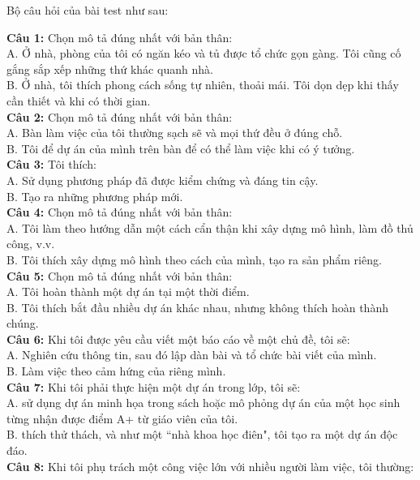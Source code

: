 Bộ câu hỏi của bài test như sau:
\begin{multicols}{2}
\noindent
\textbf{Câu 1:} Chọn mô tả đúng nhất với bản thân: \\
A. Ở nhà, phòng của tôi có ngăn kéo và tủ được tổ chức gọn gàng. Tôi cũng cố gắng sắp xếp những thứ khác quanh nhà. \\
B. Ở nhà, tôi thích phong cách sống tự nhiên, thoải mái. Tôi dọn dẹp khi thấy cần thiết và khi có thời gian. \\
\textbf{Câu 2:} Chọn mô tả đúng nhất với bản thân: \\
A. Bàn làm việc của tôi thường sạch sẽ và mọi thứ đều ở đúng chỗ. \\
B. Tôi để dự án của mình trên bàn để có thể làm việc khi có ý tưởng. \\
\textbf{Câu 3:} Tôi thích: \\
A. Sử dụng phương pháp đã được kiểm chứng và đáng tin cậy. \\
B. Tạo ra những phương pháp mới. \\
\textbf{Câu 4:} Chọn mô tả đúng nhất với bản thân: \\
A. Tôi làm theo hướng dẫn một cách cẩn thận khi xây dựng mô hình, làm đồ thủ công, v.v. \\
B. Tôi thích xây dựng mô hình theo cách của mình, tạo ra sản phẩm riêng. \\
\textbf{Câu 5:} Chọn mô tả đúng nhất với bản thân: \\
A. Tôi hoàn thành một dự án tại một thời điểm. \\
B. Tôi thích bắt đầu nhiều dự án khác nhau, nhưng không thích hoàn thành chúng. \\
\textbf{Câu 6:} Khi tôi được yêu cầu viết một báo cáo về một chủ đề, tôi sẽ: \\
A. Nghiên cứu thông tin, sau đó lập dàn bài và tổ chức bài viết của mình. \\
B. Làm việc theo cảm hứng của riêng mình. \\
\textbf{Câu 7:} Khi tôi phải thực hiện một dự án trong lớp, tôi sẽ: \\
A. sử dụng dự án minh họa trong sách hoặc mô phỏng dự án của một học sinh từng nhận được điểm A+ từ giáo viên của tôi. \\
B. thích thử thách, và như một ``nhà khoa học điên", tôi tạo ra một dự án độc đáo. \\
\textbf{Câu 8:} Khi tôi phụ trách một công việc lớn với nhiều người làm việc, tôi thường: \\

\end{multicols}
